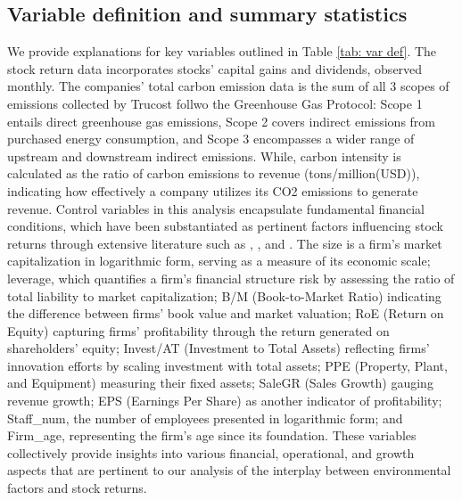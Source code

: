 \documentclass[12pt]{article}
\begin{document}
\subsection{Variable definition and summary statistics}

We provide explanations for key variables outlined in Table \ref{tab: var def}. The stock return data incorporates stocks' capital gains and dividends, observed monthly. The companies' total carbon emission data is the sum of all 3 scopes of emissions collected by Trucost follwo the Greenhouse Gas Protocol: Scope 1 entails direct greenhouse gas emissions, Scope 2 covers indirect emissions from purchased energy consumption, and Scope 3 encompasses a wider range of upstream and downstream indirect emissions. While, carbon intensity is calculated as the ratio of carbon emissions to revenue (tons/million(USD)), indicating how effectively a company utilizes its CO2 emissions to generate revenue. Control variables in this analysis encapsulate fundamental financial conditions, which have been substantiated as pertinent factors influencing stock returns through extensive literature such as \cite{perez2000firm}, \cite{george2010resolution}, and \cite{lamont2000investment}. The size is a firm's market capitalization in logarithmic form, serving as a measure of its economic scale; leverage, which quantifies a firm's financial structure risk by assessing the ratio of total liability to market capitalization; B/M (Book-to-Market Ratio) indicating the difference between firms' book value and market valuation; RoE (Return on Equity) capturing firms' profitability through the return generated on shareholders' equity; Invest/AT (Investment to Total Assets) reflecting firms' innovation efforts by scaling investment with total assets; PPE (Property, Plant, and Equipment) measuring their fixed assets; SaleGR (Sales Growth) gauging revenue growth; EPS (Earnings Per Share) as another indicator of profitability; Staff\_num, the number of employees presented in logarithmic form; and Firm\_age, representing the firm's age since its foundation. These variables collectively provide insights into various financial, operational, and growth aspects that are pertinent to our analysis of the interplay between environmental factors and stock returns.
\end{document}
